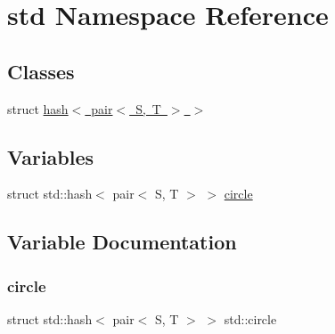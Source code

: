 \hypertarget{namespacestd}{}\section{std Namespace Reference}
\label{namespacestd}
\subsection*{Classes}
\begin{DoxyCompactItemize}
\item 
struct \mbox{\hyperlink{structstd_1_1hash_3_01pair_3_01S_00_01T_01_4_01_4}{hash$<$ pair$<$ S, T $>$ $>$}}
\end{DoxyCompactItemize}
\subsection*{Variables}
\begin{DoxyCompactItemize}
\item 
struct std\+::hash$<$ pair$<$ S, T $>$ $>$ \mbox{\hyperlink{namespacestd_acbe04eac5dc3d730864a092d6ef4202c}{circle}}
\end{DoxyCompactItemize}


\subsection{Variable Documentation}
\mbox{\label{namespacestd_acbe04eac5dc3d730864a092d6ef4202c}} 
\subsubsection{\texorpdfstring{circle}{circle}}
{\footnotesize\ttfamily struct std\+::hash$<$ pair$<$ S, T $>$ $>$ std\+::circle}

